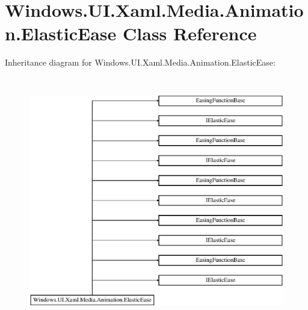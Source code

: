 \hypertarget{class_windows_1_1_u_i_1_1_xaml_1_1_media_1_1_animation_1_1_elastic_ease}{}\section{Windows.\+U\+I.\+Xaml.\+Media.\+Animation.\+Elastic\+Ease Class Reference}
\label{class_windows_1_1_u_i_1_1_xaml_1_1_media_1_1_animation_1_1_elastic_ease}
Inheritance diagram for Windows.\+U\+I.\+Xaml.\+Media.\+Animation.\+Elastic\+Ease\+:\begin{figure}[H]
\begin{center}
\leavevmode
\includegraphics[height=10.845070cm]{class_windows_1_1_u_i_1_1_xaml_1_1_media_1_1_animation_1_1_elastic_ease}
\end{center}
\end{figure}
